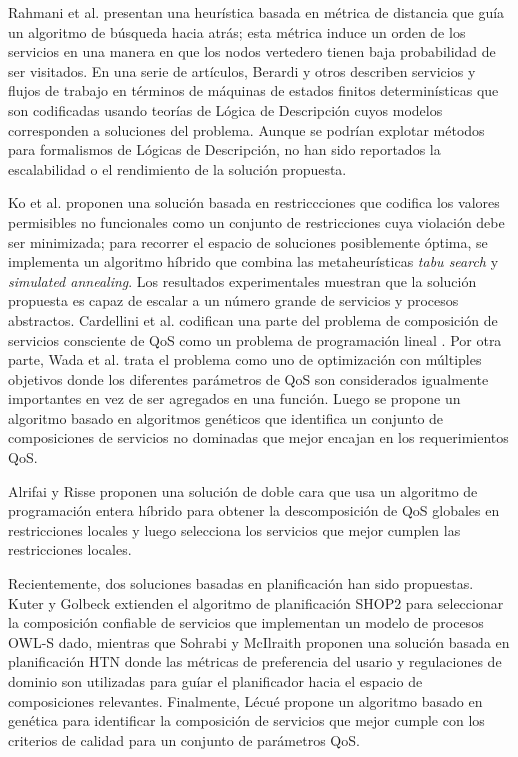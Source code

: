 Rahmani et al. \cite{rahmani08} presentan una heurística basada en métrica de distancia
que guía un algoritmo de búsqueda hacia atrás; esta métrica induce un orden de
los servicios en una manera en que los nodos vertedero tienen baja probabilidad
de ser visitados. En una serie de artículos, Berardi y otros \cite{berardi05,berardi08,berardi06}
describen
servicios y flujos de trabajo en términos de máquinas de estados finitos
determinísticas que son codificadas usando teorías de Lógica de Descripción
cuyos modelos corresponden a soluciones del problema. Aunque se podrían explotar
métodos para formalismos de Lógicas de Descripción, no han sido reportados la
escalabilidad o el rendimiento de la solución propuesta.

Ko et al. \cite{myoung08} proponen una solución basada en restriccciones que codifica
los valores permisibles no funcionales como un conjunto de restricciones cuya
violación debe ser minimizada; para recorrer el espacio de soluciones
posiblemente óptima, se implementa un algoritmo híbrido que combina las
metaheurísticas \emph{tabu search} y \emph{simulated annealing}. Los resultados
experimentales muestran que la solución propuesta es capaz de escalar a un
número grande de servicios y procesos abstractos. Cardellini et al. \cite{cardellini07}
codifican una parte del problema de composición de servicios consciente de QoS
como un problema de programación lineal \cite{cardellini07}. Por otra parte, Wada et al.
\cite{Hiroshi2008} trata el problema como uno de optimización con múltiples objetivos donde
los diferentes parámetros de QoS son considerados igualmente importantes en vez
de ser agregados en una función. Luego se propone un algoritmo basado en
algoritmos genéticos que identifica un conjunto de composiciones de servicios
no dominadas que mejor encajan en los requerimientos QoS.

Alrifai y Risse \cite{alrifaiR09} proponen una solución de doble cara que usa un
algoritmo de programación entera híbrido para obtener la descomposición de QoS
globales en restricciones locales y luego selecciona los servicios que mejor
cumplen las restricciones locales.

Recientemente, dos soluciones basadas en planificación han sido propuestas.
Kuter y Golbeck \cite{kuterG09} extienden el algoritmo de planificación SHOP2 para
seleccionar la composición confiable de servicios que implementan un modelo de
procesos OWL-S dado, mientras que Sohrabi y McIlraith \cite{sohrabiM09} proponen una
solución basada en planificación HTN donde las métricas de preferencia del
usario y regulaciones de dominio son utilizadas para guíar el planificador hacia
el espacio de composiciones relevantes. Finalmente, Lécué \cite{lecue09} propone un
algoritmo basado en genética para identificar la composición de servicios que
mejor cumple con los criterios de calidad para un conjunto de parámetros QoS.

